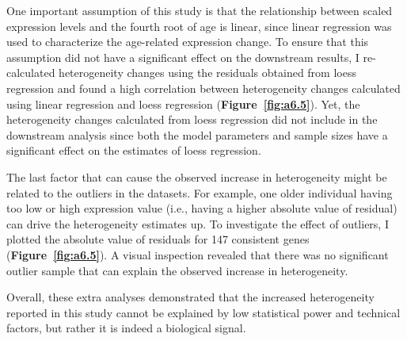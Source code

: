 One important assumption of this study is that the relationship between scaled expression levels and the fourth root of age is linear,
since linear regression was used to characterize the age-related expression change.
To ensure that this assumption did not have a significant effect on the downstream results, 
I re-calculated heterogeneity changes using the residuals obtained from loess regression and 
found a high correlation between heterogeneity changes calculated using linear regression and loess regression (\textbf{Figure~\ref{fig:a6.5}}).
Yet, the heterogeneity changes calculated from loess regression did not include in the downstream analysis
since both the model parameters and sample sizes have a significant effect on the estimates of loess regression.

The last factor that can cause the observed increase in heterogeneity might be related to the outliers in the datasets.
For example, one older individual having too low or high expression value (i.e., having a higher absolute value of residual) 
can drive the heterogeneity estimates up.
To investigate the effect of outliers, I plotted the absolute value of residuals for 147 consistent genes (\textbf{Figure~\ref{fig:a6.5}}).
A visual inspection revealed that there was no significant outlier sample that can explain the observed increase in heterogeneity.

Overall, these extra analyses demonstrated that the increased heterogeneity reported in this study cannot be explained by low statistical power and technical factors,
but rather it is indeed a biological signal.

